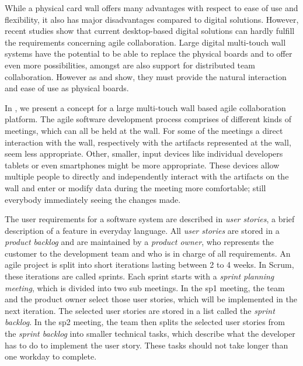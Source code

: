 \documentclass{sigchi}
\begin{document}
While a physical card wall offers many advantages with respect to ease of use and flexibility, it also has major disadvantages compared to digital solutions. However, recent studies \cite{udcw:31721, Mateescu:2015} show that current desktop-based digital solutions can hardly fulfill the requirements concerning agile collaboration.
Large digital multi-touch wall systems have the potential to be able to replace the physical boards and to offer even more possibilities, amongst are also support for distributed team collaboration. However as \cite{udcw:31721} and \cite{Mateescu:2015} show, they must provide the natural interaction and ease of use as physical boards. 

In \cite{Mateescu:2015}, we present a concept for a large multi-touch wall based agile collaboration platform. The agile software development process comprises of different kinds of meetings, which can all be held at the wall. For some of the meetings a direct interaction with the wall, respectively with the artifacts represented at the wall, seem less appropriate. Other, smaller, input devices like individual developers tablets or even smartphones might be more appropriate. These devices allow multiple people to directly and independently interact with the artifacts on the wall and enter or modify data during the meeting more comfortable; still everybody immediately seeing the changes made. 

The user requirements for a software system are described in \textit{user stories}, a brief description of a feature in everyday language.
All \textit{user stories} are stored in a \textit{product backlog} and are maintained by a \textit{product owner}, who represents the customer to the development team and who is in charge of all requirements.
An agile project is split into short iterations lasting between 2 to 4 weeks.
In Scrum, these iterations are called sprints. Each sprint starts with a \textit{sprint planning meeting}, which is divided into two sub meetings. In the \gls{sp1} meeting, the team and the product owner select those user stories, which will be implemented in the next iteration.
The selected user stories are stored in a list called the \textit{sprint backlog}.
In the \gls{sp2} meeting, the team then splits the selected user stories from the \textit{sprint backlog} into smaller technical tasks, which describe what the developer has to do to implement the user story. These tasks should not take longer than one workday to complete.
\end{document}
